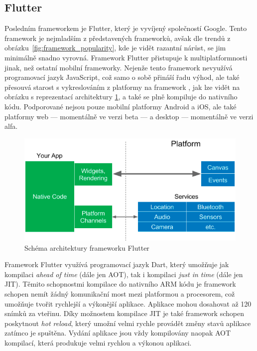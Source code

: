 \subsection{Flutter}

Posledním frameworkem je Flutter,
který je vyvíjený společností Google.
Tento framework je nejmladším z představených frameworků,
avšak dle trendů z obrázku~\ref{fig:framework_popularity},
kde je vidět razantní nárůst,
se jim minimálně snadno vyrovná.
Framework Flutter přistupuje k multiplatformnosti jinak,
než ostatní mobilní frameworky.
Nejenže tento framework nevyužívá programovací jazyk JavaScript,
což samo o sobě přináší řadu výhod,
ale také přesouvá starost s vykreslováním z platformy na framework
\cite{hackernoon_flutter},
jak lze vidět na obrázku s reprezentací architektury
\ref{fig:framework_flutter},
a také se plně kompiluje do nativního kódu.
\cite{dashmagazine_mobile_frameworks}
Podporované nejsou pouze mobilní platformy Android a iOS,
ale také platformy web
--- momentálně ve verzi beta ---
a desktop
--- momentálně ve verzi alfa.

\begin{figure}[ht!]
    \centering
    \includegraphics[width=\linewidth]{assets/technology-research/framework/flutter.png}
    \caption{Schéma architektury frameworku Flutter  \cite{hackernoon_flutter}}
    \label{fig:framework_flutter}
\end{figure}

Framework Flutter využívá programovací jazyk Dart,
který umožňuje jak kompilaci \emph{ahead of time} (dále jen AOT),
tak i kompilaci \emph{just in time} (dále jen JIT).
\cite{hackernoon_flutter}
Těmito schopnostmi kompilace do nativního ARM kódu je framework schopen
nemít žádný komunikační most mezi platformou a procesorem,
což umožňuje tvořit rychlejší a výkonější aplikace.
Aplikace mohou dosahovat až 120 snímků za vteřinu.
\cite{dashmagazine_mobile_frameworks}
Díky možnostem kompilace JIT je také framework schopen poskytnout
\emph{hot reload},
který umožní velmi rychle provádět změny stavů aplikace zatímco je spuštěna.
Vydání aplikace jsou vždy kompilovány naopak AOT kompilací,
která produkuje velmi rychlou a výkonou aplikaci.
\cite{hackernoon_flutter}

